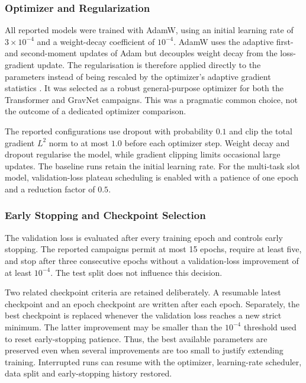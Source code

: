 \subsubsection{Optimizer and Regularization}

All reported models were trained with AdamW, using an initial learning rate of
\(3\times10^{-4}\) and a weight-decay coefficient of \(10^{-4}\). AdamW uses
the adaptive first- and second-moment updates of Adam but decouples weight
decay from the loss-gradient update. The regularisation is therefore applied
directly to the parameters instead of being rescaled by the optimizer's
adaptive gradient statistics \cite{loshchilov2019-adamw}. It was selected as a
robust general-purpose optimizer for both the Transformer and GravNet
campaigns. This was a pragmatic common choice, not the outcome of a dedicated
optimizer comparison.

The reported configurations use dropout with probability \(0.1\) and clip the
total gradient \(L^2\) norm to at most \(1.0\) before each optimizer step.
Weight decay and dropout regularise the model, while gradient clipping limits
occasional large updates. The baseline runs retain the initial learning rate.
For the multi-task slot model, validation-loss plateau scheduling is enabled
with a patience of one epoch and a reduction factor of \(0.5\).



\subsubsection{Early Stopping and Checkpoint Selection}

The validation loss is evaluated after every training epoch and controls early
stopping. The reported campaigns permit at most 15 epochs, require at least
five, and stop after three consecutive epochs without a validation-loss
improvement of at least \(10^{-4}\). The test split does not influence this
decision.

Two related checkpoint criteria are retained deliberately. A resumable latest
checkpoint and an epoch checkpoint are written after each epoch. Separately,
the best checkpoint is replaced whenever the validation loss reaches a new
strict minimum. The latter improvement may be smaller than the \(10^{-4}\)
threshold used to reset early-stopping patience. Thus, the best available
parameters are preserved even when several improvements are too small to
justify extending training. Interrupted runs can resume with the optimizer,
learning-rate scheduler, data split and early-stopping history restored.




